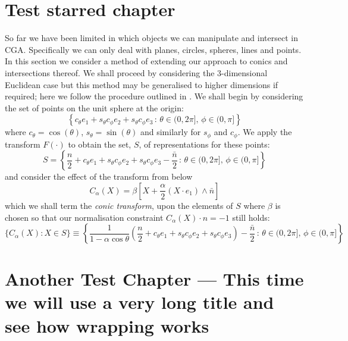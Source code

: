 \chapter*{Test starred chapter}

So far we have been limited in which objects we can manipulate and intersect
in CGA. Specifically we can only deal with planes, circles, spheres, lines and
points. In this section we consider a method of extending our approach to
conics and intersections thereof. We shall proceed by considering the 
3-dimensional Euclidean case but this method may be generalised to higher
dimensions if required; here we follow the procedure outlined in
\cite{anthonyChina}.
We shall begin by considering the set of points on the unit sphere at the 
origin:
\[
\left\{ c_\theta e_1 + s_\theta c_\phi e_2 + s_\theta c_\phi e_3\,:\,
	\theta \in (0,2\pi],\,\phi \in (0,\pi] \right\}
\]
where $c_\theta = \cos(\theta)$, $s_\theta = \sin(\theta)$ and similarly
for $s_\phi$ and $c_\phi$. We apply the transform $F(\cdot)$ to
obtain the set, $S$, of representations for these points:
\[
S = \left\{ \frac{n}{2} + c_\theta e_1 + s_\theta c_\phi e_2
+ s_\theta c_\phi e_3 -
    \frac{\bar{n}}{2} \,:\,
	\theta \in (0,2\pi],\,\phi \in (0,\pi] \right\}
\]
and consider the effect of the transform from \cite{anthonyChina} below 
\[
C_\alpha(X) = \beta \left[ X + \frac{\alpha}{2} (X \cdot e_1) \wedge \bar{n} \right]
\]
which we shall term the \emph{conic transform}, upon the elements of $S$ 
where $\beta$ is chosen so that our normalisation constraint
$C_\alpha(X) \cdot n = -1$ still holds:
\[
\{ C_\alpha(X) : X \in S \} \equiv \left\{ \frac{1}{1 - \alpha \cos \theta} \left(
	\frac{n}{2} + c_\theta e_1 + s_\theta c_\phi e_2 
              + s_\theta c_\phi e_3 \right) -
    \frac{\bar{n}}{2} \,:\,
	\theta \in (0,2\pi],\,\phi \in (0,\pi] \right\}
\]

\chapter{Another Test Chapter --- This time we will use a very long title
and see how wrapping works}

